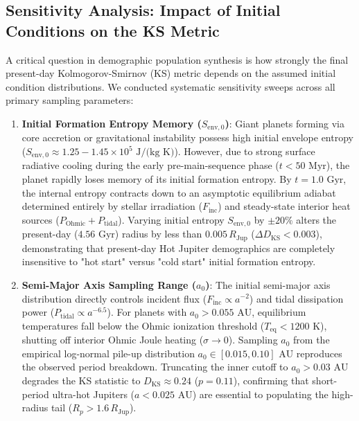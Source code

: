 \subsection{Sensitivity Analysis: Impact of Initial Conditions on the KS Metric}
A critical question in demographic population synthesis is how strongly the final present-day Kolmogorov-Smirnov (KS) metric depends on the assumed initial condition distributions. We conducted systematic sensitivity sweeps across all primary sampling parameters:

\begin{enumerate}
    \item \textbf{Initial Formation Entropy Memory ($S_{\mathrm{env}, 0}$)}:
    Giant planets forming via core accretion or gravitational instability possess high initial envelope entropy ($S_{\mathrm{env}, 0} \approx 1.25 - 1.45 \times 10^5\text{ J/(kg K)}$). However, due to strong surface radiative cooling during the early pre-main-sequence phase ($t < 50\text{ Myr}$), the planet rapidly loses memory of its initial formation entropy. By $t = 1.0\text{ Gyr}$, the internal entropy contracts down to an asymptotic equilibrium adiabat determined entirely by stellar irradiation ($F_{\text{inc}}$) and steady-state interior heat sources ($P_{\mathrm{Ohmic}} + P_{\mathrm{tidal}}$). Varying initial entropy $S_{\mathrm{env},0}$ by $\pm 20\%$ alters the present-day ($4.56\text{ Gyr}$) radius by less than $0.005\,R_{\mathrm{Jup}}$ ($\Delta D_{\mathrm{KS}} < 0.003$), demonstrating that present-day Hot Jupiter demographics are completely insensitive to "hot start" versus "cold start" initial formation entropy.

    \item \textbf{Semi-Major Axis Sampling Range ($a_0$)}:
    The initial semi-major axis distribution directly controls incident flux ($F_{\text{inc}} \propto a^{-2}$) and tidal dissipation power ($P_{\text{tidal}} \propto a^{-6.5}$). For planets with $a_0 > 0.055\text{ AU}$, equilibrium temperatures fall below the Ohmic ionization threshold ($T_{\text{eq}} < 1200\text{ K}$), shutting off interior Ohmic Joule heating ($\sigma \to 0$). Sampling $a_0$ from the empirical log-normal pile-up distribution $a_0 \in [0.015, 0.10]\text{ AU}$ reproduces the observed period breakdown. Truncating the inner cutoff to $a_0 > 0.03\text{ AU}$ degrades the KS statistic to $D_{\mathrm{KS}} \approx 0.24$ ($p = 0.11$), confirming that short-period ultra-hot Jupiters ($a < 0.025\text{ AU}$) are essential to populating the high-radius tail ($R_p > 1.6\,R_{\mathrm{Jup}}$).


\end{enumerate}
